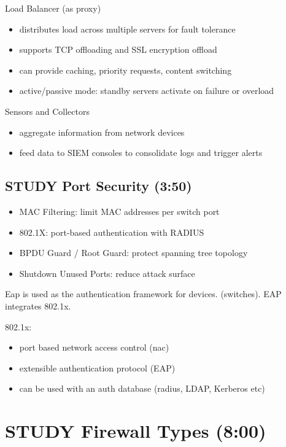 \documentclass[11pt]{article}
\begin{document}
Load Balancer (as proxy)
\begin{itemize}
\item distributes load across multiple servers for fault tolerance
\item supports TCP offloading and SSL encryption offload
\item can provide caching, priority requests, content switching
\item active/passive mode: standby servers activate on failure or overload
\end{itemize}

Sensors and Collectors
\begin{itemize}
\item aggregate information from network devices
\item feed data to SIEM consoles to consolidate logs and trigger alerts
\end{itemize}
\subsection{{\bfseries\sffamily STUDY} Port Security (3:50)}
\label{sec:org552dcce}
\begin{itemize}
\item MAC Filtering: limit MAC addresses per switch port
\item 802.1X: port‑based authentication with RADIUS
\item BPDU Guard / Root Guard: protect spanning tree topology
\item Shutdown Unused Ports: reduce attack surface
\end{itemize}


Eap is used as the authentication framework for devices. (switches). EAP integrates 802.1x.

802.1x:
\begin{itemize}
\item port based network access control (nac)
\item extensible authentication protocol (EAP)
\item can be used with an auth database (radius, LDAP, Kerberos etc)
\end{itemize}
\section{{\bfseries\sffamily STUDY} Firewall Types (8:00)}
\label{sec:org4d48cff}
\end{document}
